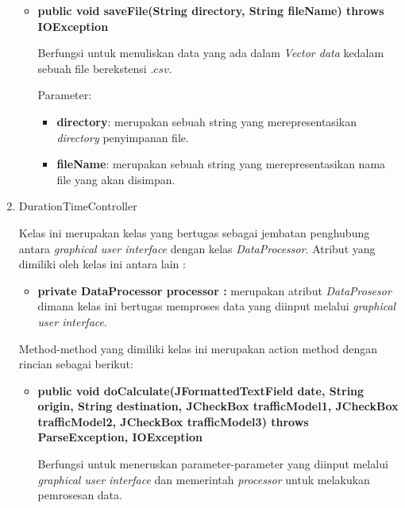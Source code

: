 \begin{enumerate}
\begin{itemize}
		\item \textbf{public void saveFile(String directory, String fileName) throws IOException}
			
		Berfungsi untuk menuliskan data yang ada dalam \textit{Vector data} kedalam sebuah file berekstensi \(.csv\).
		
		Parameter:
	\begin{itemize}
		\item \textbf{directory}: merupakan sebuah string yang merepresentasikan \textit{directory} penyimpanan file. 
		\item \textbf{fileName}: merupakan sebuah string yang merepresentasikan nama file yang akan disimpan.
	\end{itemize}
	\end{itemize}
	
	\item DurationTimeController
	
	Kelas ini merupakan kelas yang bertugas sebagai jembatan penghubung antara \textit{graphical user interface} dengan kelas \textit{DataProcessor}. Atribut yang dimiliki oleh kelas ini antara lain :
	
		\begin{itemize}
			\item \textbf{private DataProcessor processor :} merupakan atribut \textit{DataProsesor} dimana kelas ini bertugas memproses data yang diinput melalui \textit{graphical user interface}.
		\end{itemize}
	
	Method-method yang dimiliki kelas ini merupakan action method dengan rincian sebagai berikut:
	
	\begin{itemize}
		\item \textbf{public void doCalculate(JFormattedTextField date, String origin, String destination, JCheckBox trafficModel1, JCheckBox trafficModel2, JCheckBox trafficModel3) throws ParseException, IOException} 
		
		Berfungsi untuk meneruskan parameter-parameter yang diinput melalui \textit{graphical user interface} dan memerintah \textit{processor} untuk melakukan pemrosesan data.
		

\end{itemize}
\end{enumerate}
